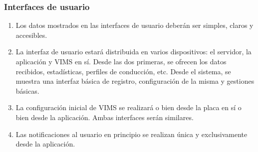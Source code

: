 \subsubsection{Interfaces de usuario}
\begin{enumerate}[resume, label=\textbf{\texttt{RNF-\arabic*}}]
  \item\label{nf:pretty} Los datos mostrados en las interfaces de usuario deberán
  ser simples, claros y accesibles.
  \item\label{nf:devices} La interfaz de usuario estará distribuida en varios
  dispositivos: el servidor, la aplicación y \ac{VIMS} en sí. Desde las dos primeras,
  se ofrecen los datos recibidos, estadísticas, perfiles de
  conducción, etc. Desde el sistema, se muestra una interfaz básica de registro,
  configuración de la misma y gestiones básicas.
  \item\label{nf:initial-config} La configuración inicial de \ac{VIMS} se realizará
  o bien desde la placa en sí o bien desde la aplicación. Ambas interfaces serán
  similares.
  \item\label{nf:notifications} Las notificaciones al usuario en principio se
  realizan única y exclusivamente desde la aplicación.
\end{enumerate}
